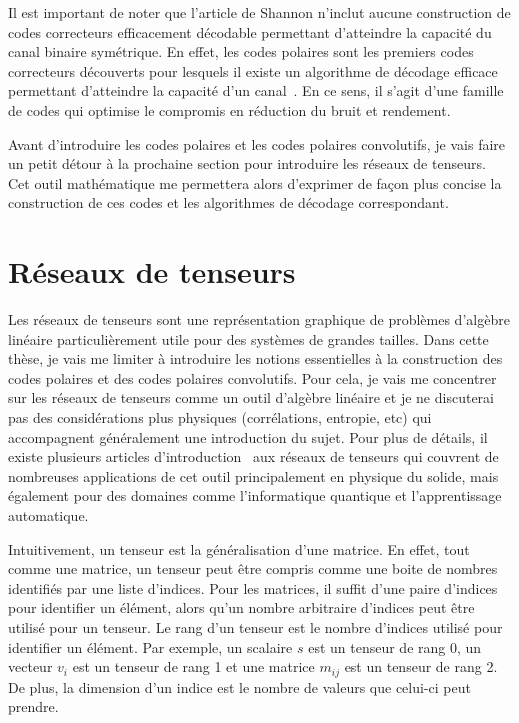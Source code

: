 Il est important de noter que l'article de Shannon n'inclut aucune construction de codes 
correcteurs efficacement décodable permettant d'atteindre la capacité du canal binaire symétrique.
En effet, les codes polaires sont les premiers codes correcteurs découverts 
pour lesquels il existe un algorithme de décodage efficace permettant d'atteindre 
la capacité d'un canal~\cite{arikan_channel_2009}. 
En ce sens, il s'agit d'une famille de codes qui optimise le compromis en réduction du bruit 
et rendement.

Avant d'introduire les codes polaires et les codes polaires convolutifs,
je vais faire un petit détour à la prochaine section pour introduire les réseaux de tenseurs.
Cet outil mathématique me permettera alors d'exprimer de façon plus concise la construction
de ces codes et les algorithmes de décodage correspondant.

\section{Réseaux de tenseurs}
\label{sec:reseaux_tenseurs}

Les réseaux de tenseurs sont une représentation graphique de problèmes d'algèbre linéaire
particulièrement utile pour des systèmes de grandes tailles.
Dans cette thèse, 
je vais me limiter à introduire les notions essentielles à la construction des 
codes polaires et des codes polaires convolutifs.
Pour cela, 
je vais me concentrer sur les réseaux de tenseurs comme un outil d'algèbre linéaire 
et je ne discuterai pas des considérations plus physiques (corrélations, entropie, etc) 
qui accompagnent généralement une introduction du sujet.
Pour plus de détails,
il existe plusieurs articles d'introduction~\cite{bridgeman_hand-waving_2017, baker_methodes_2021} aux réseaux de tenseurs qui couvrent de nombreuses applications de cet outil principalement en physique du solide,
mais également pour des domaines comme l'informatique quantique et l'apprentissage automatique. 

Intuitivement, 
un tenseur est la généralisation d'une matrice.
En effet,
tout comme une matrice, 
un tenseur peut être compris comme une boite de nombres identifiés par une liste d'indices. 
Pour les matrices,
il suffit d'une paire d'indices pour identifier un élément,
alors qu'un nombre arbitraire d'indices peut être utilisé pour un tenseur. 
Le rang d'un tenseur est le nombre d'indices utilisé pour identifier un élément.
Par exemple, 
un scalaire $s$ est un tenseur de rang 0, 
un vecteur $v_i$ est un tenseur de rang 1 
et une matrice $m_{ij}$ est un tenseur de rang 2.
De plus,
la dimension d'un indice est le nombre de valeurs que celui-ci peut prendre.

